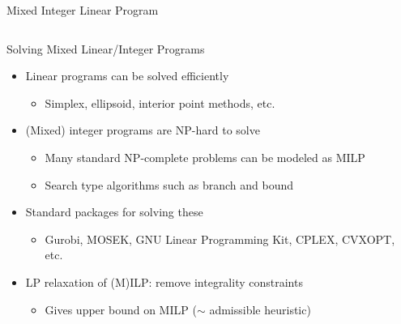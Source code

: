 \documentclass[11pt,aspectratio=169]{beamer}
\begin{document}
\begin{frame}{Mixed Integer Linear Program}
\begin{columns}
\begin{column}{0.7\textwidth}
\begin{center}
     \end{center}
    \end{column}
   \end{columns}
  \end{frame}
 
  \begin{frame}{Solving Mixed Linear/Integer Programs}
   \begin{itemize}[<+->]
   \setlength{\itemsep}{1.5em}
    \item Linear programs can be solved efficiently
    \begin{itemize}
     \item Simplex, ellipsoid, interior point methods, etc.
    \end{itemize}
    \item (Mixed) integer programs are \alert{NP-hard} to solve
    \begin{itemize}
     \item Many standard NP-complete problems can be modeled as MILP
     \item Search type algorithms such as branch and bound
    \end{itemize}
    \item Standard packages for solving these
    \begin{itemize}
     \item Gurobi, MOSEK, GNU Linear Programming Kit, CPLEX, CVXOPT, etc.
    \end{itemize}
    \item LP relaxation of (M)ILP: remove integrality constraints
    \begin{itemize}
     \item Gives upper bound on MILP ($\sim$ admissible heuristic)
    \end{itemize}
   \end{itemize}
  \end{frame}
 
\end{document}
